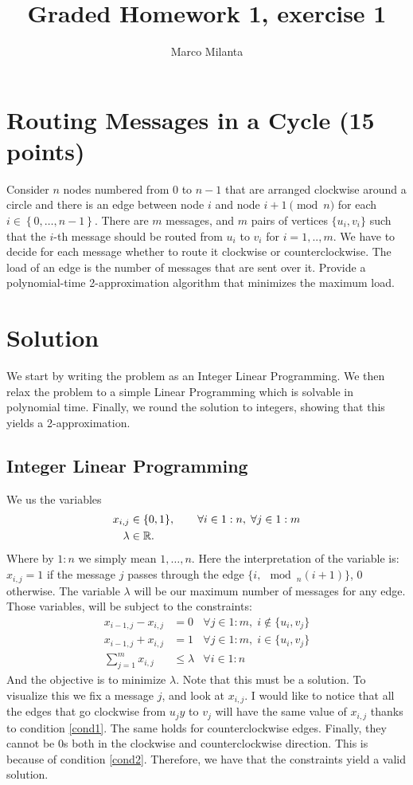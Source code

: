 \documentclass[11pt]{article}
\begin{document}
\author{Marco Milanta}
\title{Graded Homework 1, exercise 1}
\maketitle


\section*{Routing Messages in a Cycle (15 points)}Consider $n$ nodes numbered from $0$ to $n-1$ that are arranged clockwise around a circle and there is an edge between node $i$ and node $i+1\pmod{n}$ for each $i \in \left\{0,\dots, n-1\right\}$. There are $m$ messages, and $m$ pairs of vertices $\{u_i,v_i\}$ such that the $i$-th message should be routed from $u_i$ to $v_i$ for $i=1,..,m$. We have to decide for each message whether to route it clockwise or counterclockwise. The load of an edge is the number of messages that are sent over it. Provide a polynomial-time 2-approximation algorithm that minimizes the maximum load.
\section*{Solution}
We start by writing the problem as an Integer Linear Programming. We then relax the problem to a simple Linear Programming which is solvable in polynomial time. Finally, we round the solution to integers, showing that this yields a 2-approximation.
\subsection*{Integer Linear Programming}
We us the variables
\begin{align*}
    x_{i,j} &\in \{0,1\}, \qquad \forall i \in 1:n,\; \forall j \in 1:m\\
    \lambda &\in \mathbb{R}.
\end{align*}
Where by $1:n$ we simply mean $1,\dots,n$. Here the interpretation of the variable is: $x_{i,j} = 1$ if the message $j$ passes through the edge $\{i,\mod_n(i+1)\}$, $0$ otherwise. The variable $\lambda$ will be our maximum number of messages for any edge. Those variables, will be subject to the constraints:
\begin{align}
    x_{i-1,j} - x_{i,j} &= 0&\forall j \in 1:m,\; i \notin \{u_i,v_j\}\label{cond1}\\
    x_{i-1,j} + x_{i,j} &= 1&\forall j \in 1:m,\; i \in \{u_i,v_j\}\label{cond2}\\
    \sum_{j=1}^mx_{i,j} &\leq \lambda & \forall i \in 1:n
\end{align}
And the objective is to minimize $\lambda$. Note that this must be a solution. To visualize this we fix a message $j$, and look at $x_{i,j}$. I would like to notice that all the edges that go clockwise from $u_jy$ to $v_j$ will have the same value of $x_{i,j}$ thanks to condition \ref{cond1}. The same holds for counterclockwise edges. Finally, they cannot be $0$s both in the clockwise and counterclockwise direction. This is because of condition \ref{cond2}. Therefore, we have that the constraints yield a valid solution.
\end{document}
